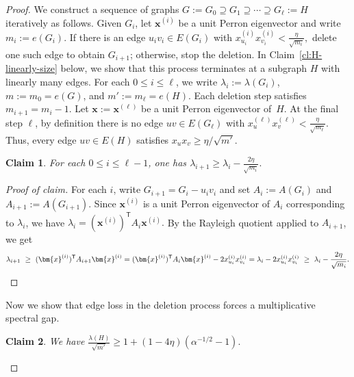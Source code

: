 \documentclass[11pt]{article}
\newtheorem{claim}{Claim}
\theoremstyle{definition}
\theoremstyle{plain}
\newenvironment{poc}{\begin{proof}[Proof of claim]\renewcommand*{\qedsymbol}{$\blacksquare$}}{\end{proof}}
\begin{document}
\begin{proof} 
We construct a sequence of graphs $G:=G_0\supseteq G_1\supseteq \cdots \supseteq G_\ell :=H$ iteratively as follows.
Given $G_i$, let $\bm{x}^{(i)}$ be a unit Perron eigenvector and write $m_i:=e(G_i)$.
If there is an edge $u_iv_i\in E(G_i)$ with $x^{(i)}_{u_i}x^{(i)}_{v_i}<\frac{\eta}{\sqrt{m_i}},$
delete one such edge to obtain $G_{i+1}$; otherwise, stop the deletion. 
In Claim~\ref{cl:H-linearly-size} below, we show that this process terminates at a subgraph \(H\) with linearly many edges.  
For each $0\le i\le \ell$, 
we write $\lambda_i:=\lambda(G_i)$, $m:=m_0=e(G)$, and $m':=m_\ell=e(H)$.
Each deletion step satisfies $m_{i+1}=m_i-1$. 
Let $\bm{x}:=\bm{x}^{(\ell)}$ be a unit Perron eigenvector of~$H$. 
At the final step $\ell$, by definition there is no edge $uv\in E(G_\ell)$ with
$x^{(\ell)}_ux^{(\ell)}_v<\frac{\eta}{\sqrt{m_\ell}}.$
Thus, every edge $uv\in E(H)$ satisfies $x_u x_v\ge \eta/\sqrt{m'}$.

\begin{claim}\label{clm:pruning-one-step-rayleigh}
For each $0\le i\le \ell-1$, one has $\lambda_{i+1} \ge \lambda_i-\frac{2\eta}{\sqrt{m_i}}.$
\end{claim}

\begin{poc} 
For each $i$, write $G_{i+1}=G_i-u_iv_i$ and set $A_i:=A(G_i)$ and $A_{i+1}:=A(G_{i+1})$.
Since $\bm{x}^{(i)}$ is a unit Perron eigenvector of $A_i$ corresponding to \(\lambda_i\), we have $\lambda_i=(\bm{x}^{(i)})^{\mathsf T}A_i \bm{x}^{(i)}.$
By the Rayleigh quotient applied to $A_{i+1}$, we get 
\[
  \lambda_{i+1}
  \ \ge\
  (\bm{x}^{(i)})^{\mathsf T}A_{i+1}\bm{x}^{(i)}
  =
  (\bm{x}^{(i)})^{\mathsf T}A_i \bm{x}^{(i)}-2x^{(i)}_{u_i}x^{(i)}_{v_i}
  =
  \lambda_i-2x^{(i)}_{u_i}x^{(i)}_{v_i}
  \ \ge\ \lambda_i-\frac{2\eta}{\sqrt{m_i}}. 
  \qedhere 
\]
\end{poc}
 
Now we show that edge loss in the deletion process forces a multiplicative spectral gap.

\begin{claim} \label{claim:multiplicative-gap}
  We have
$\frac{\lambda(H)}{\sqrt{m'}}
        \ge
        1+ (1- 4\eta) (\alpha^{-1/2} -1).$
\end{claim}


\end{proof}
\end{document}
